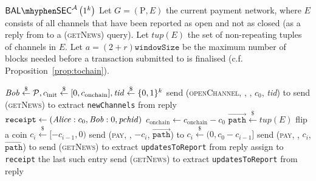   \begin{gamebox}{$\mathsf{BAL \mhyphen SEC}^{\adversary}\left(1^k\right)$}
    Let $G = (\mathrm{P}, E)$ the current payment network, where $E$ consists
    of all channels that have been reported as open and not as closed (as a
    reply from \fpaynet{} to a (\textsc{getNews}) query). Let
    $\mathit{tup}(E)$ the set of non-repeating tuples of channels in $E$. Let
    $a = (2 + r)\mathtt{windowSize}$ be the maximum number of blocks needed
    before a transaction submitted to \ledger{} is finalised (c.f.
    Proposition~\ref{prop:tochain}).
    \begin{algorithmic}[1]
        \State {}
        \State $\mathit{Bob} \overset{\$}{\gets} \mathcal{P}, c_{\mathrm{init}}
        \overset{\$}{\gets} [0, c_{\mathrm{onchain}}], \mathit{tid}
        \overset{\$}{\gets} \{0, 1\}^k$
        \State send (\textsc{openChannel}, \alice, \bob, $c_0$, \textit{tid}) to
        \alice
        \Repeat
          \State send (\textsc{getNews}) to \alice{}
          \State extract \texttt{newChannels} from reply
        \State $\mathtt{receipt} \gets (\mathit{Alice}: c_0, \mathit{Bob}: 0, \mathit{pchid})$
        \State $c_{\mathrm{onchain}} \gets c_{\mathrm{onchain}} - c_0$
        \Statex
        \State {}
          \State $\overrightarrow{\mathtt{path}} \overset{\$}{\gets}
          \mathit{tup}(E)$
          \State flip a coin
            \State $c_i \overset{\$}{\gets} [-c_{i-1}, 0)$
            \State send (\textsc{pay}, \bob, $-c_i$,
            $\overrightarrow{\mathtt{path}}$) to \alice
          \Else
            \State {}
            \State $c_i \overset{\$}{\gets} (0, c_0 - c_{i-1}]$
            \State send (\textsc{pay}, \alice, $c_i$,
            $\overrightarrow{\mathtt{path}}$) to \bob
          \EndIf
          \State send (\textsc{getNews}) to \alice{}
          \State extract \texttt{updatesToReport} from reply
             \State assign to \texttt{receipt} the last such entry
          \EndIf
        \EndFor
        \Statex
        \State {}
        \State send (\textsc{getNews}) to \alice{}
        \State extract \texttt{updatesToReport} from reply
\end{algorithmic}
\end{gamebox}
